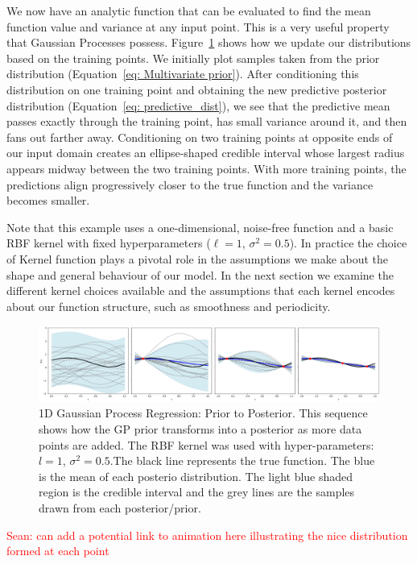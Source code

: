 \documentclass[12pt]{article}
\newcommand{\Sean}[1]{{\textcolor{red}{{Sean: #1}} }}
\begin{document}
\noindent
We now have an analytic function that can be evaluated to find the mean function value and variance at any input point.
This is a very useful property that Gaussian Processes possess. Figure~\ref{fig: priortoposterior} shows how we update our
distributions based on the training points. We initially plot samples taken from the prior distribution (Equation~\ref{eq: Multivariate prior}). 
After conditioning this distribution on one training point and obtaining the new predictive posterior distribution (Equation~\ref{eq: predictive_dist}), 
we see that the predictive mean passes exactly through the training point, has small variance around it, and then fans out farther away. 
Conditioning on two training points at opposite ends of our input domain creates an ellipse-shaped credible interval whose largest radius 
appears midway between the two training points. With more training points, the predictions align progressively closer to the true function 
and the variance becomes smaller.

\noindent
Note that this example uses a one-dimensional, noise-free function and a basic RBF kernel with fixed hyperparameters (\(\ell = 1\), \(\sigma^2 = 0.5\)). 
In practice the choice of Kernel function plays a pivotal role in the assumptions we make about the shape and general behaviour of our model. In the next section
we examine the different kernel choices available and the assumptions that each kernel encodes about our function structure, such as smoothness and periodicity.



\begin{figure}[H]
    \centering
    \includegraphics[width=\textwidth]{LatexPlots/1dplots/priortoposterior.png}
    \caption{1D Gaussian Process Regression: Prior to Posterior. This sequence shows how the GP prior transforms into a posterior as more data points are added. 
    The RBF kernel was used with hyper-parameters: $l = 1$, $\sigma^2 = 0.5$.The black line represents the true function. The blue is the mean of each posterio distribution. 
    The light blue shaded region is the credible interval and the grey lines are the samples drawn from each posterior/prior. }
    \label{fig: priortoposterior}
\end{figure}
\Sean{can add a potential link to animation here illustrating the nice distribution formed at each point}
\end{document}
